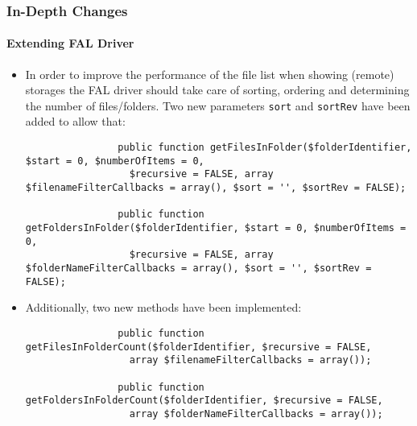 \begin{frame}[fragile]
	\frametitle{In-Depth Changes}
	\framesubtitle{Extending FAL Driver}

	\lstset{basicstyle=\tiny\ttfamily}

	\begin{itemize}
		\item In order to improve the performance of the file list when showing (remote) storages
			the FAL driver should take care of sorting, ordering and determining the number
			of files/folders. Two new parameters \texttt{sort} and \texttt{sortRev} have been
			added to allow that:

			\begin{lstlisting}
				public function getFilesInFolder($folderIdentifier, $start = 0, $numberOfItems = 0,
				  $recursive = FALSE, array $filenameFilterCallbacks = array(), $sort = '', $sortRev = FALSE);

				public function getFoldersInFolder($folderIdentifier, $start = 0, $numberOfItems = 0,
				  $recursive = FALSE, array $folderNameFilterCallbacks = array(), $sort = '', $sortRev = FALSE);
			\end{lstlisting}

		\item Additionally, two new methods have been implemented:

			\begin{lstlisting}
				public function getFilesInFolderCount($folderIdentifier, $recursive = FALSE,
				  array $filenameFilterCallbacks = array());

				public function getFoldersInFolderCount($folderIdentifier, $recursive = FALSE,
				  array $folderNameFilterCallbacks = array());
			\end{lstlisting}

	\end{itemize}

\end{frame}

